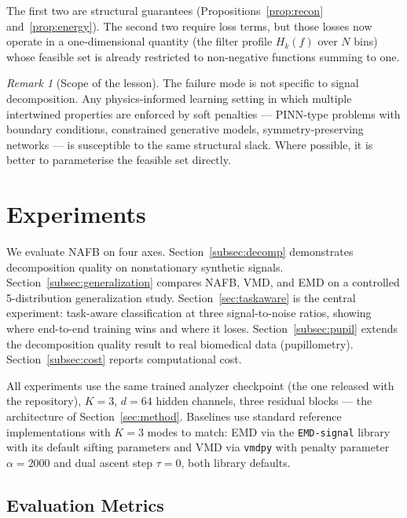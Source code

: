 \documentclass[journal]{IEEEtran}
\theoremstyle{remark}
\newtheorem{remark}{Remark}
\begin{document}
The first two are structural guarantees (Propositions~\ref{prop:recon}
and~\ref{prop:energy}). The second two require loss terms, but those
losses now operate in a one-dimensional quantity (the filter profile
$H_{k}(f)$ over $N$ bins) whose feasible set is already restricted to
non-negative functions summing to one.

\begin{remark}[Scope of the lesson]
The failure mode is not specific to signal decomposition. Any
physics-informed learning setting in which multiple intertwined
properties are enforced by soft penalties --- PINN-type problems with
boundary conditions, constrained generative models, symmetry-preserving
networks --- is susceptible to the same structural slack. Where
possible, it is better to parameterise the feasible set directly.
\end{remark}

\section{Experiments}
\label{sec:experiments}

We evaluate NAFB on four axes. Section~\ref{subsec:decomp} demonstrates
decomposition quality on nonstationary synthetic signals.
Section~\ref{subsec:generalization} compares NAFB, VMD, and EMD on a
controlled 5-distribution generalization study.
Section~\ref{sec:taskaware} is the central experiment: task-aware
classification at three signal-to-noise ratios, showing where
end-to-end training wins and where it loses. Section~\ref{subsec:pupil}
extends the decomposition quality result to real biomedical data
(pupillometry). Section~\ref{subsec:cost} reports computational cost.

All experiments use the same trained analyzer checkpoint (the one
released with the repository), $K = 3$, $d = 64$ hidden channels,
three residual blocks --- the architecture of Section~\ref{sec:method}.
Baselines use standard reference implementations with $K = 3$ modes to
match: EMD via the \texttt{EMD-signal} library with its default sifting
parameters and VMD via \texttt{vmdpy} with penalty parameter
$\alpha = 2000$ and dual ascent step $\tau = 0$, both library defaults.

\subsection{Evaluation Metrics}
\label{subsec:metrics}
\end{document}
